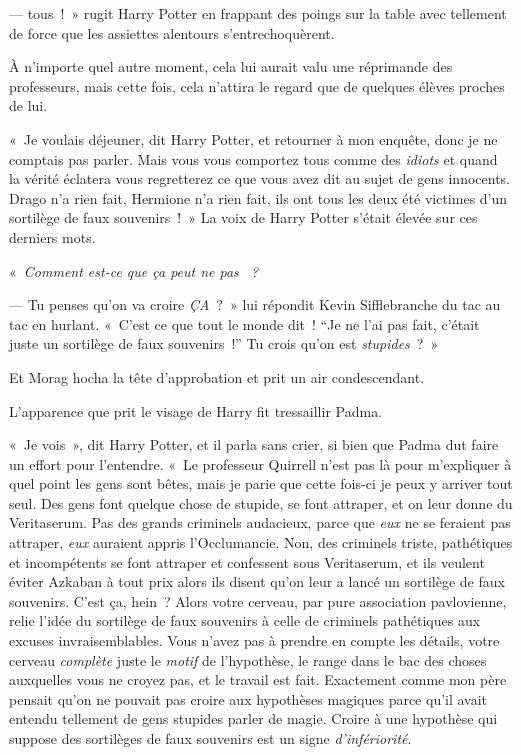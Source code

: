 ---  tous~!~» rugit Harry Potter en frappant des poings sur la table avec tellement de force que les assiettes alentours s'entrechoquèrent.

À n'importe quel autre moment, cela lui aurait valu une réprimande des professeurs, mais cette fois, cela n'attira le regard que de quelques élèves proches de lui.

«~Je voulais déjeuner, dit Harry Potter, et retourner à mon enquête, donc je ne comptais pas parler. Mais vous vous comportez tous comme des \emph{idiots} et quand la vérité éclatera vous regretterez ce que vous avez dit au sujet de gens innocents. Drago n'a rien fait, Hermione n'a rien fait, ils ont tous les deux été victimes d'un sortilège de faux souvenirs~!~» La voix de Harry Potter s'était élevée sur ces derniers mots.

«~\emph{Comment est-ce que ça peut ne pas ~?}

--- Tu penses qu'on va croire \emph{ÇA}~?~» lui répondit Kevin Sifflebranche du tac au tac en hurlant. «~C'est ce que tout le monde dit~! “Je ne l'ai pas fait, c'était juste un sortilège de faux souvenirs~!” Tu crois qu'on est \emph{stupides}~?~»

Et Morag hocha la tête d'approbation et prit un air condescendant.

L'apparence que prit le visage de Harry fit tressaillir Padma.

«~Je vois~», dit Harry Potter, et il parla sans crier, si bien que Padma dut faire un effort pour l'entendre. «~Le professeur Quirrell n'est pas là pour m'expliquer à quel point les gens sont bêtes, mais je parie que cette fois-ci je peux y arriver tout seul. Des gens font quelque chose de stupide, se font attraper, et on leur donne du Veritaserum. Pas des grands criminels audacieux, parce que \emph{eux} ne se feraient pas attraper, \emph{eux} auraient appris l'Occlumancie. Non, des criminels triste, pathétiques et incompétents se font attraper et confessent sous Veritaserum, et ils veulent éviter Azkaban à tout prix alors ils disent qu'on leur a lancé un sortilège de faux souvenirs. C'est ça, hein~? Alors votre cerveau, par pure association pavlovienne, relie l'idée du sortilège de faux souvenirs à celle de criminels pathétiques aux excuses invraisemblables. Vous n'avez pas à prendre en compte les détails, votre cerveau \emph{complète} juste le \emph{motif} de l'hypothèse, le range dans le bac des choses auxquelles vous ne croyez pas, et le travail est fait. Exactement comme mon père pensait qu'on ne pouvait pas croire aux hypothèses magiques parce qu'il avait entendu tellement de gens stupides parler de magie. Croire à une hypothèse qui suppose des sortilèges de faux souvenirs est un signe \emph{d'infériorité}.

